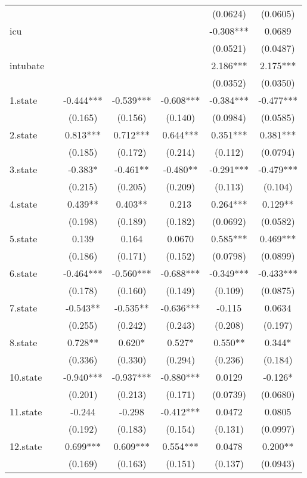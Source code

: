 \documentclass[]{article}
\begin{document}
\begin{tabular}{lcccccc}
 &  &  &  &  & (0.0624) & (0.0605) \\
icu &  &  &  &  & -0.308*** & 0.0689 \\
 &  &  &  &  & (0.0521) & (0.0487) \\
intubate &  &  &  &  & 2.186*** & 2.175*** \\
 &  &  &  &  & (0.0352) & (0.0350) \\
1.state &  & -0.444*** & -0.539*** & -0.608*** & -0.384*** & -0.477*** \\
 &  & (0.165) & (0.156) & (0.140) & (0.0984) & (0.0585) \\
2.state &  & 0.813*** & 0.712*** & 0.644*** & 0.351*** & 0.381*** \\
 &  & (0.185) & (0.172) & (0.214) & (0.112) & (0.0794) \\
3.state &  & -0.383* & -0.461** & -0.480** & -0.291*** & -0.479*** \\
 &  & (0.215) & (0.205) & (0.209) & (0.113) & (0.104) \\
4.state &  & 0.439** & 0.403** & 0.213 & 0.264*** & 0.129** \\
 &  & (0.198) & (0.189) & (0.182) & (0.0692) & (0.0582) \\
5.state &  & 0.139 & 0.164 & 0.0670 & 0.585*** & 0.469*** \\
 &  & (0.186) & (0.171) & (0.152) & (0.0798) & (0.0899) \\
6.state &  & -0.464*** & -0.560*** & -0.688*** & -0.349*** & -0.433*** \\
 &  & (0.178) & (0.160) & (0.149) & (0.109) & (0.0875) \\
7.state &  & -0.543** & -0.535** & -0.636*** & -0.115 & 0.0634 \\
 &  & (0.255) & (0.242) & (0.243) & (0.208) & (0.197) \\
8.state &  & 0.728** & 0.620* & 0.527* & 0.550** & 0.344* \\
 &  & (0.336) & (0.330) & (0.294) & (0.236) & (0.184) \\
10.state &  & -0.940*** & -0.937*** & -0.880*** & 0.0129 & -0.126* \\
 &  & (0.201) & (0.213) & (0.171) & (0.0739) & (0.0680) \\
11.state &  & -0.244 & -0.298 & -0.412*** & 0.0472 & 0.0805 \\
 &  & (0.192) & (0.183) & (0.154) & (0.131) & (0.0997) \\
12.state &  & 0.699*** & 0.609*** & 0.554*** & 0.0478 & 0.200** \\
 &  & (0.169) & (0.163) & (0.151) & (0.137) & (0.0943) \\

\end{tabular}
\end{document}
